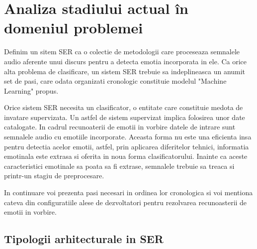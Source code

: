 \documentclass[a4paper,12pt]{book}
\begin{document}
	\chapter{Analiza stadiului actual în domeniul problemei} \label{introdP}
				Definim un sitem SER ca o colectie de metodologii care proceseaza semnalele audio aferente unui discurs pentru a detecta emotia incorporata in ele. Ca orice alta problema de clasificare, un sistem SER trebuie sa indeplineasca un anumit set de pasi, care odata organizati cronologic constituie modelul "Machine Learning" propus. \par
				
				Orice sistem SER necesita un clasificator, o entitate care constituie medota de invatare supervizata. Un astfel de sistem supervizat implica folosirea unor date catalogate. In cadrul recunoaterii de emotii in vorbire datele de intrare sunt semnalele audio cu emotiile incorporate. Aceasta forma nu este una eficienta insa pentru detectia acelor emotii, astfel, prin aplicarea diferitelor tehnici, informatia emotinala este extrasa si oferita in noua forma clasificatorului. Inainte ca aceste caracteristici emotinale sa poata sa fi extrase, semnalele trebuie sa treaca si printr-un stagiu de preprocesare.\par
				
				In continuare voi prezenta pasi necesari in ordinea lor cronologica si voi mentiona cateva din configuratiile alese de dezvoltatori pentru rezolvarea recunoasterii de emotii in vorbire.
				\section{Tipologii arhitecturale in SER} 
\end{document}
